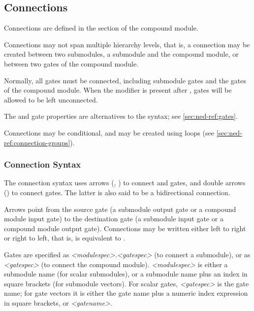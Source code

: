 \subsection{Connections}
\label{sec:ned-ref:connections}

Connections are defined in the  section of the compound module.

Connections may not span multiple hierarchy levels, that is, a connection
may be created between two submodules, a submodule and the compound module,
or between two gates of the compound module.

Normally, all gates must be connected, including submodule gates and the gates
of the compound module. When the  modifier is present
after , gates will be allowed to be left unconnected.

\begin{note}
    The  and  gate properties are alternatives to the
     syntax; see \ref{sec:ned-ref:gates}.
\end{note}

Connections may be conditional, and may be created using loops (see
\ref{sec:ned-ref:connection-groups}).


\subsubsection{Connection Syntax}
\label{sec:ned-ref:connection-syntax}

The connection syntax uses arrows (\ttt{-{}->}, \ttt{<-{}-}) to connect
 and  gates, and double arrows
(\ttt{<-{}->}) to connect  gates. The latter is
also said to be a bidirectional connection.

Arrows point from the source gate (a submodule output gate or a compound
module input gate) to the destination gate (a submodule input gate or a
compound module output gate). Connections may be written either left to right
or right to left, that is,  is equivalent to .

Gates are specified as \textit{<modulespec>.<gatespec>} (to connect a submodule),
or as \textit{<gatespec>} (to connect the compound module). \textit{<modulespec>}
is either a submodule name (for scalar submodules), or a submodule name plus
an index in square brackets (for submodule vectors). For scalar gates,
\textit{<gatespec>} is the gate name; for gate vectors it is either
the gate name plus a numeric index expression in square brackets,
or \textit{<gatename>}\ttt{++}.

